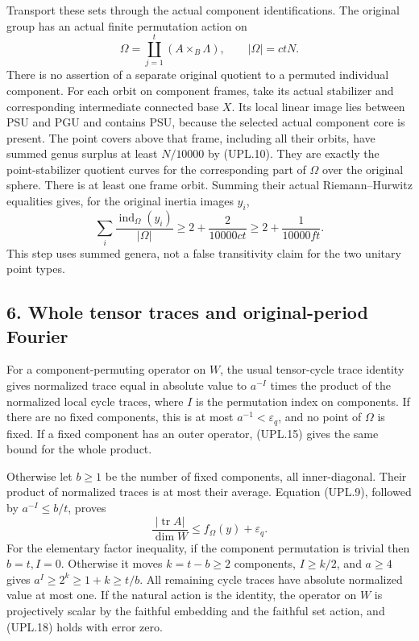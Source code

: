 Transport these sets through the actual component identifications.
The original group has an actual finite permutation action on
\[
               \Omega=\coprod_{j=1}^t(A\times_B\Lambda),
                             \qquad |\Omega|=ctN.
 \tag{UPL.16}
\]
There is no assertion of a separate original quotient to a permuted
individual component. For each orbit on component frames, take its
actual stabilizer and corresponding intermediate connected base
\(X\). Its local linear image lies between PSU and PGU and
contains PSU, because the selected actual component core is present.
The point covers above that frame, including all their orbits, have
summed genus surplus at least \(N/10000\) by (UPL.10).
They are exactly the point-stabilizer quotient curves for the
corresponding part of \(\Omega\) over the original sphere.
There is at least one frame orbit. Summing their actual
Riemann--Hurwitz equalities gives, for the original inertia images
\(y_i\),
\[
 \sum_i\frac{\operatorname{ind}_\Omega(y_i)}{|\Omega|}
          \ge2+\frac{2}{10000ct}
          \ge2+\frac1{10000ft}.
 \tag{UPL.17}
\]
This step uses summed genera, not a false transitivity claim for
the two unitary point types.

\subsection*{6. Whole tensor traces and original-period Fourier}

For a component-permuting operator on \(W\), the usual tensor-cycle
trace identity gives normalized trace equal in absolute value to
\(a^{-I}\) times the product of the normalized local cycle traces,
where \(I\) is the permutation index on components.
If there are no fixed components, this is at most \(a^{-1}<
\varepsilon_q\), and no point of \(\Omega\) is fixed.
If a fixed component has an outer operator, (UPL.15) gives the
same bound for the whole product.

Otherwise let \(b\ge1\) be the number of fixed components, all
inner-diagonal. Their product of normalized traces is at most their
average. Equation (UPL.9), followed by
\(a^{-I}\le b/t\), proves
\[
                  \frac{|\operatorname{tr}A|}{\dim W}
                           \le f_\Omega(y)+\varepsilon_q.
 \tag{UPL.18}
\]
For the elementary factor inequality, if the component permutation
is trivial then \(b=t,I=0\). Otherwise it moves \(k=t-b\ge2\)
components, \(I\ge k/2\), and \(a\ge4\) gives
\(a^I\ge2^k\ge1+k\ge t/b\).
All remaining cycle traces have absolute normalized value at most
one. If the natural action is the identity, the operator on \(W\)
is projectively scalar by the faithful embedding and the faithful
set action, and (UPL.18) holds with error zero.

